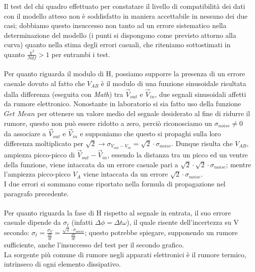 \documentclass{article}
\theoremstyle{definition}
\begin{document}
\noindent Il test del chi quadro effettuato per constatare il livello di compatibilità dei dati con il modello atteso non è soddisfatto in maniera accettabile in nessuno dei due casi; dobbiamo questo insuccesso non tanto ad un errore sistematico nella determinazione del modello (i punti si dispongono come previsto attorno alla curva) quanto nella stima degli errori casuali, che riteniamo sottostimati in quanto \(\frac{\chi^{2}}{Ndf} > 1\) per entrambi i test. \\\\
Per quanto riguarda il modulo di H, possiamo supporre la presenza di un errore casuale dovuto al fatto che \(V_{AB}\) è il modulo di una funzione sinusoidale risultata dalla differenza (eseguita con \textit{Math}) tra \(\vec{V}_{out}\) e \(\vec{V}_{in}\), due segnali sinusoidali affetti da rumore elettronico. Nonostante in laboratorio si sia fatto uso della funzione \(\textit{Get Mean}\) per ottenere un valore medio del segnale desiderato al fine di ridurre il rumore, questo non può essere ridotto a zero, perciò riconosciamo un \(\sigma_{noise} \neq 0\) da associare a \(\vec{V}_{out}\) e \(\vec{V}_{in}\) e supponiamo che questo si propaghi sulla loro differenza moltiplicato per \(\sqrt{2} \rightarrow \sigma_{V_{out} - V_{in}} = \sqrt{2}\cdot \sigma_{noise}\). Dunque risulta che \(V_{AB}\), ampiezza picco-picco di \(\vec{V}_{out} - \vec{V}_{in}\), essendo la distanza tra un picco ed un ventre della funzione, viene intaccata da un errore casuale pari a \(\sqrt{2} \cdot \sqrt{2} \cdot \sigma_{noise}\); mentre l'ampiezza picco-picco \(V_{A}\) viene intaccata da un errore \(\sqrt{2} \cdot \sigma_{noise}\). \\ I due errori si sommano come riportato nella formula di propagazione nel paragrafo precedente.\\\\
Per quanto riguarda la fase di H rispetto al segnale in entrata, il suo errore casuale dipende da \(\sigma_{t}\) (infatti \(\Delta \phi = \Delta t \omega\)), il quale risente dell'incertezza su V secondo: \( \sigma_{t} = \frac{\sigma_{V}}{\frac{dV}{dt}} = \frac{\sqrt{2} \cdot \sigma_{noise}}{\frac{dV}{dt}}\); questo potrebbe spiegare, supponendo un rumore sufficiente, anche l'insuccesso del test per il secondo grafico. \\

\noindent La sorgente più comune di rumore negli apparati elettronici è il rumore termico, intrinseco di ogni elemento dissipativo. \\
\end{document}
